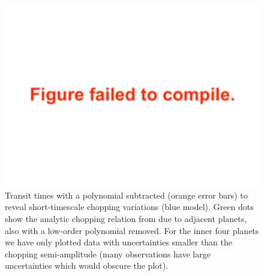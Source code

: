 \documentclass[twocolumn]{aastex63}
\begin{document}
\begin{figure}
    \centering
    \includegraphics[width=\hsize]{figures/T1_chopping.pdf}
    {Transit times with a polynomial subtracted (orange error bars) to reveal short-timescale chopping variations (blue model).  Green dots show the analytic chopping relation from \citet{Agol2005,Deck2015} due to adjacent planets, also with a low-order polynomial removed. For the inner four planets we have
        only plotted data with
        uncertainties smaller than the chopping semi-amplitude  (many observations have large uncertainties which would obscure the plot).}
    \label{fig:chopping}
\end{figure}
\end{document}
